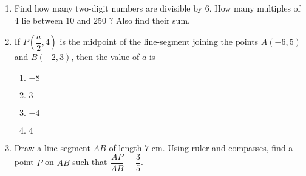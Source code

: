 \begin{enumerate}
\item Find how many two-digit numbers are divisible by $6$.
 How many multiples of $4$ lie between $10$ and $250$ ? Also find their sum.
  

\item If $P\left(\dfrac{a}{2},4\right)$ is the midpoint of the line-segment joining the points $A(-6, 5)$ and $B(-2, 3)$, then the value of $a$ is

\begin{enumerate}[label=(\Alph*)]
    \item $-8$
    \item $3$
    \item $-4$
    \item $4$
\end{enumerate}
\item Draw a line segment $AB$ of length $7$ cm. Using ruler and compasses, find a point $P$ on $AB$ such that $\dfrac{AP}{AB} = \dfrac{3}{5}$.
\end{enumerate}
